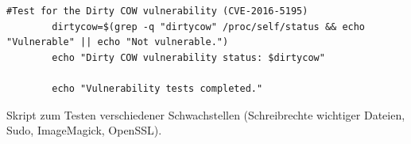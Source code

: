 \documentclass[10pt, a4paper,onecolumn ,titlepage]{article}
\begin{document}
\begin{lstlisting}[label={lst:schwachstellentestSkript}]
        #Test for the Dirty COW vulnerability (CVE-2016-5195)
        dirtycow=$(grep -q "dirtycow" /proc/self/status && echo "Vulnerable" || echo "Not vulnerable.")
        echo "Dirty COW vulnerability status: $dirtycow"

        echo "Vulnerability tests completed."
    \end{lstlisting} Skript zum Testen verschiedener Schwachstellen (Schreibrechte wichtiger Dateien, Sudo, ImageMagick, OpenSSL).
\end{document}
